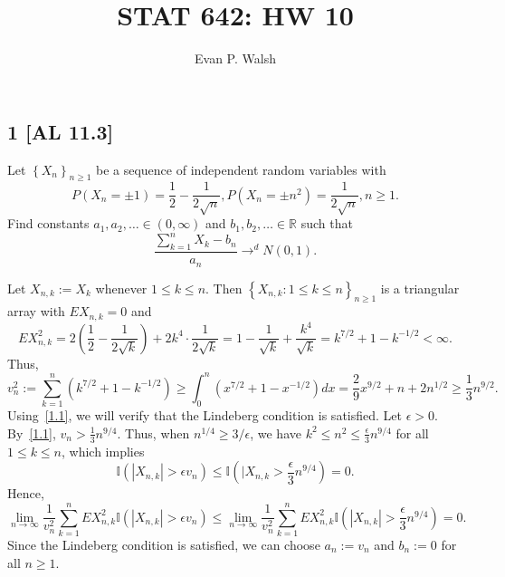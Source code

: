 \documentclass[12pt]{article}
\title{STAT 642: HW 10}
\author{Evan P. Walsh}
\begin{document}
\maketitle

\subsection*{1 [AL 11.3]}
\begin{tcolorbox}
  Let $\left\{ X_n \right\}_{n\geq 1}$ be a sequence of independent random variables with 
  \[ 
    P(X_n = \pm 1) = \frac{1}{2} - \frac{1}{2\sqrt{n}}, P(X_n = \pm n^{2}) = \frac{1}{2\sqrt{n}}, n \geq 1. 
  \]
  Find constants $a_1, a_2, \hdots \in (0,\infty)$ and $b_1, b_2, \hdots \in \mathbb{R}$ such that 
  \[
    \frac{\sum_{k=1}^{n}X_k - b_n}{a_n} \rightarrow^{d} N(0,1).
  \]
\end{tcolorbox}
Let $X_{n,k} := X_k$ whenever $1 \leq k \leq n$. Then $\left\{ X_{n,k} : 1\leq k \leq n \right\}_{n\geq 1}$ is a triangular array with $EX_{n,k} = 0$
and 
\[
  EX_{n,k}^{2} = 2\left( \frac{1}{2} - \frac{1}{2\sqrt{k}} \right) + 2k^{4}\cdot \frac{1}{2\sqrt{k}} = 1 - \frac{1}{\sqrt{k}} + \frac{k^{4}}{\sqrt{k}} = k^{7/2} + 1 - k^{-1/2} < \infty.
\]
Thus,
\begin{equation}
  v_{n}^{2} := \sum_{k=1}^{n}(k^{7/2} + 1 - k^{-1/2}) \geq \int_{0}^{n}(x^{7/2} + 1 - x^{-1/2})dx = \frac{2}{9}x^{9/2} + n + 2n^{1/2} \geq
  \frac{1}{3}n^{9/2}.
  \label{1.1}
\end{equation}
Using~\eqref{1.1}, we will verify that the Lindeberg condition is satisfied. Let $\epsilon > 0$. By~\eqref{1.1}, $v_n > \frac{1}{3}n^{9/4}$.
Thus, when $n^{1/4} \geq 3 / \epsilon$, we have $k^{2} \leq
n^{2} \leq \frac{\epsilon}{3}n^{9/4}$ for all $1 \leq k \leq n$, which implies 
\[
  \mathbb{I}\left(|X_{n,k}| > \epsilon v_{n}\right) \leq \mathbb{I}\left(|X_{n,k} > \frac{\epsilon}{3}n^{9/4} \right) = 0.
\]
Hence,
\[ 
  \lim_{n\rightarrow\infty}\frac{1}{v_{n}^{2}}\sum_{k=1}^{n}EX_{n,k}^{2}\mathbb{I}\left( |X_{n,k}| > \epsilon v_{n} \right) \leq
  \lim_{n\rightarrow\infty}\frac{1}{v_{n}^{2}}\sum_{k=1}^{n}EX_{n,k}^{2}\mathbb{I}\left( |X_{n,k}| > \frac{\epsilon}{3}n^{9/4} \right) = 0.
\]
Since the Lindeberg condition is satisfied, we can choose $a_n := v_n$ and $b_n := 0$ for all $n \geq 1$.
\end{document}
